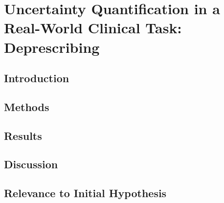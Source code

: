 \chapter{Uncertainty Quantification in a Real-World Clinical Task: Deprescribing} \label{chapter:deprescribing}

\section{Introduction}
\section{Methods}
\section{Results}
\section{Discussion}
\section{Relevance to Initial Hypothesis}
